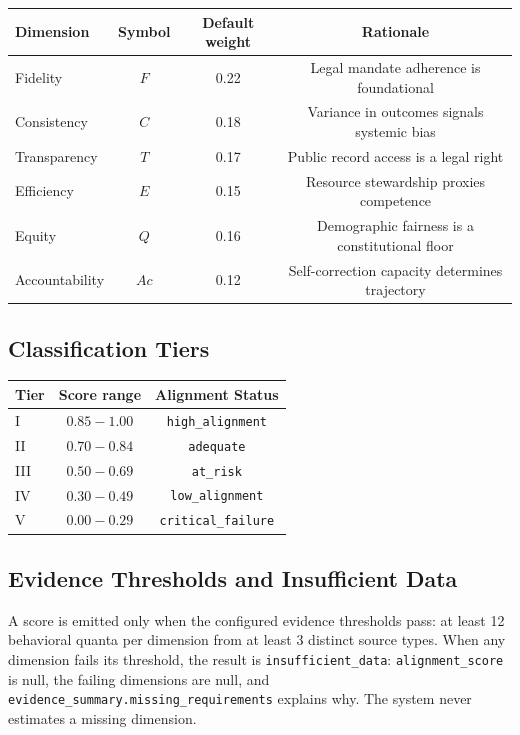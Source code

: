 \begin{center}
\begin{tabular}{lccc}
\toprule
Dimension & Symbol & Default weight & Rationale \\
\midrule
Fidelity       & \(F\)  & 0.22 & Legal mandate adherence is foundational \\
Consistency    & \(C\)  & 0.18 & Variance in outcomes signals systemic bias \\
Transparency   & \(T\)  & 0.17 & Public record access is a legal right \\
Efficiency     & \(E\)  & 0.15 & Resource stewardship proxies competence \\
Equity         & \(Q\)  & 0.16 & Demographic fairness is a constitutional floor \\
Accountability & \(Ac\) & 0.12 & Self-correction capacity determines trajectory \\
\bottomrule
\end{tabular}
\end{center}

\subsection{Classification Tiers}

\begin{center}
\begin{tabular}{lcc}
\toprule
Tier & Score range & Alignment Status \\
\midrule
I   & \(0.85 - 1.00\) & \texttt{high\_alignment} \\
II  & \(0.70 - 0.84\) & \texttt{adequate} \\
III & \(0.50 - 0.69\) & \texttt{at\_risk} \\
IV  & \(0.30 - 0.49\) & \texttt{low\_alignment} \\
V   & \(0.00 - 0.29\) & \texttt{critical\_failure} \\
\bottomrule
\end{tabular}
\end{center}

\subsection{Evidence Thresholds and Insufficient Data}

A score is emitted only when the configured evidence thresholds pass:
at least 12 behavioral quanta per dimension from at least 3 distinct source
types. When any dimension fails its threshold, the result is
\texttt{insufficient\_data}: \texttt{alignment\_score} is null, the failing
dimensions are null, and \texttt{evidence\_summary.missing\_requirements}
explains why. The system never estimates a missing dimension.

